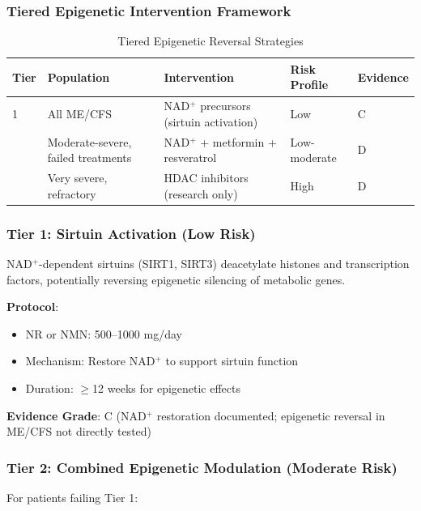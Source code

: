 \subsubsection{Tiered Epigenetic Intervention Framework}

\begin{table}[htbp]
\centering
\caption{Tiered Epigenetic Reversal Strategies}
\label{tab:epigenetic-tiers}
\begin{tabular}{p{1.5cm}p{3cm}p{4.5cm}p{2.5cm}p{2cm}}
\toprule
\textbf{Tier} & \textbf{Population} & \textbf{Intervention} & \textbf{Risk Profile} & \textbf{Evidence} \\
\midrule
1 & All ME/CFS & NAD$^+$ precursors (sirtuin activation) & Low & C \\
\addlinespace
2 & Moderate-severe, failed treatments & NAD$^+$ + metformin + resveratrol & Low-moderate & D \\
\addlinespace
3 & Very severe, refractory & HDAC inhibitors (research only) & High & D \\
\bottomrule
\end{tabular}
\end{table}

\subsubsection{Tier 1: Sirtuin Activation (Low Risk)}

NAD$^+$-dependent sirtuins (SIRT1, SIRT3) deacetylate histones and transcription factors, potentially reversing epigenetic silencing of metabolic genes.

\textbf{Protocol}:
\begin{itemize}
    \item NR or NMN: 500--1000 mg/day
    \item Mechanism: Restore NAD$^+$ to support sirtuin function
    \item Duration: $\geq$12 weeks for epigenetic effects
\end{itemize}

\textbf{Evidence Grade}: C (NAD$^+$ restoration documented; epigenetic reversal in ME/CFS not directly tested)

\subsubsection{Tier 2: Combined Epigenetic Modulation (Moderate Risk)}

For patients failing Tier 1:

